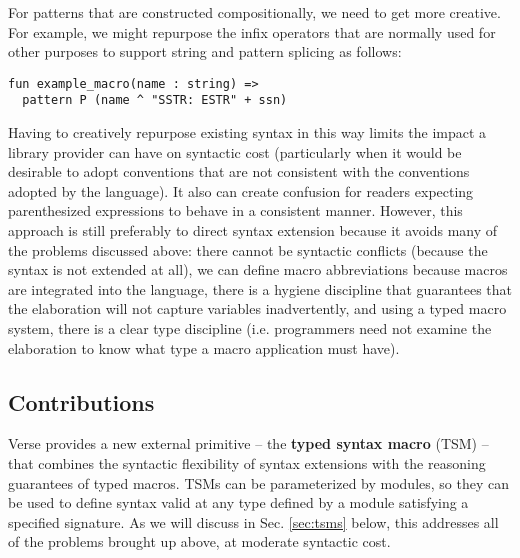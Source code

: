 For patterns that are constructed compositionally, we need to get more creative. For example, we might repurpose the infix operators that are normally used for other purposes to support string and pattern splicing as follows:

\begin{lstlisting}[numbers=none,escapechar=|]
fun example_macro(name : string) => 
  pattern P (name ^ "SSTR: ESTR" + ssn)
\end{lstlisting}

Having to creatively repurpose existing syntax in this way limits the impact a library provider can have on syntactic cost (particularly when it would be desirable to adopt conventions that are not consistent with the conventions adopted by the language). It also can create confusion for readers expecting parenthesized expressions to behave in a consistent manner. However,  this approach is still preferably to direct syntax extension because it avoids many of the problems discussed above: there cannot be syntactic conflicts (because the syntax is not extended at all), we can define macro abbreviations because macros are integrated into the language, there is a hygiene discipline that guarantees that the elaboration will not capture variables inadvertently, and using a typed macro system, there is a clear type discipline (i.e. programmers need not examine the elaboration to know what type a macro application must have). 


\subsection{Contributions}\label{sec:syntax-contributions}
Verse provides a new external primitive -- the \textbf{typed syntax macro} (TSM) -- that combines the syntactic flexibility of syntax extensions with the reasoning guarantees of typed macros. TSMs can be parameterized by modules, so they can be used to define syntax valid at any type defined by a module satisfying a specified signature. As we will discuss in Sec. \ref{sec:tsms} below, this addresses all of the problems brought up above, at moderate syntactic cost.

